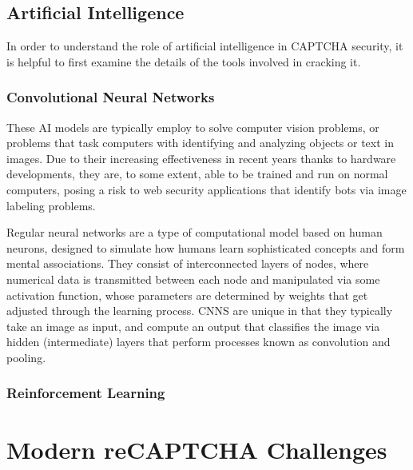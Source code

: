 \documentclass[sigplan,screen,nonacm]{acmart-tagged}
\begin{document}
\subsection{Artificial Intelligence}
\label{sec:background-ai}

In order to understand the role of artificial intelligence in CAPTCHA security, it is helpful to first examine the details of the tools involved in cracking it.

\subsubsection{Convolutional Neural Networks}
\label{sec:background-cnn}

These AI models are typically employ to solve computer vision problems, or problems that task computers with identifying and analyzing objects or text in images. Due to their increasing effectiveness in recent years thanks to hardware developments, they are, to some extent, able to be trained and run on normal computers, posing a risk to web security applications that identify bots via image labeling problems.

Regular neural networks are a type of computational model based on human neurons, designed to simulate how humans learn sophisticated concepts and form mental associations. They consist of interconnected layers of nodes, where numerical data is transmitted between each node and manipulated via some activation function, whose parameters are determined by weights that get adjusted through the learning process. CNNS are unique in that they typically take an image as input, and compute an output that classifies the image via hidden (intermediate) layers that perform processes known as convolution and pooling.



\subsubsection{Reinforcement Learning}
\label{sec:background-rl}



\section{Modern reCAPTCHA Challenges}
\label{sec:modern-captchas}
\end{document}
